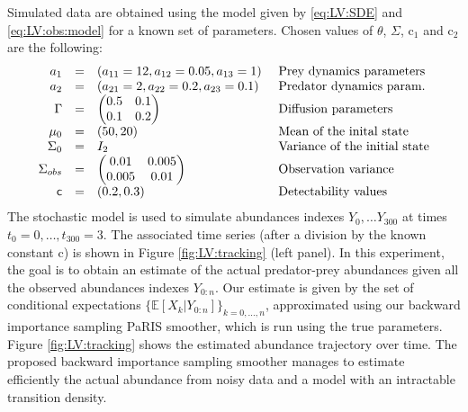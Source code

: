 \documentclass[12pt]{article}
\def\pE{\mathbb{E}}
\begin{document}
Simulated data are obtained using the model given by \eqref{eq:LV:SDE} and \eqref{eq:LV:obs:model} for a known set of parameters.
 Chosen values of $\theta$, $\Sigma$, $\text{c}_1$ and $\text{c}_2$ are the following:
 \begin{align*}
\begin{array}{rcll}
a_1 &=& (a_{11} = 12, a_{12} = 0.05, a_{13} = 1) & \text{ Prey dynamics parameters}\\
a_2 &=& (a_{21} = 2, a_{22} =  0.2, a_{23} = 0.1) & \text{ Predator dynamics param.}\\
\Gamma &=&
\begin{pmatrix}
0.5 & 0.1\\
0.1 & 0.2
\end{pmatrix} & \text{ Diffusion parameters}\\
\mu_0 &=& (50,20) &\text{ Mean of the inital state}\\
\Sigma_0 &=& I_2 &\text{ Variance of the initial state}\\
\Sigma_{obs} &=&
\begin{pmatrix}
0.01& 0.005\\
 0.005& 0.01
\end{pmatrix}& \text{ Observation variance}\\
\sf{c} &=& (0.2, 0.3) & \text{ Detectability values}
\end{array}
\end{align*} 
The stochastic model is used to simulate abundances indexes $Y_0,\dots Y_{300}$ at times $t_0 = 0,\dots, t_{300} = 3$. 
The associated time series (after a division by the known constant $\text{c}$) is shown in Figure \ref{fig:LV:tracking} (left panel). 
In this experiment, the goal is to obtain an estimate of the actual predator-prey abundances given all the observed abundances indexes $Y_{0:n}$. 
Our estimate is given by the set of conditional expectations $\lbrace\pE[ X_k \vert Y_{0:n}]\rbrace_{k = 0,\dots, n}$, approximated using our backward importance sampling PaRIS smoother, which is run using the true parameters. 
Figure \ref{fig:LV:tracking} shows the estimated abundance trajectory over time. 
The proposed backward importance sampling smoother manages to estimate efficiently the actual abundance from noisy data and a model with an intractable transition density.
\end{document}
